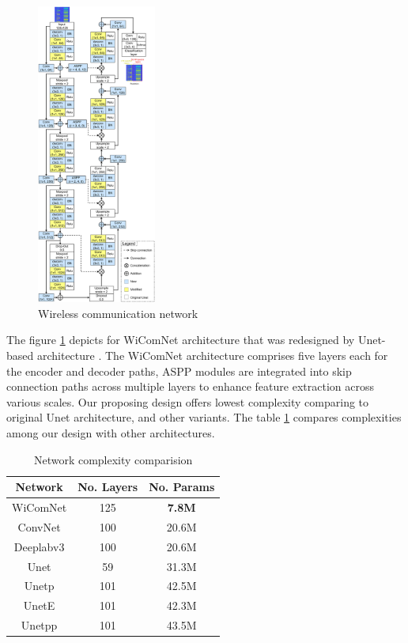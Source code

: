 \documentclass[journal]{IEEEtran} %
\begin{document}
\begin{figure}[!ht]
    \centering
    \includegraphics[width=0.35\textwidth]{img/Design-WiComNetB.jpg}
    \caption{Wireless communication network}
    \label{fig4}
\end{figure}


\indent The figure \ref{fig4} depicts for WiComNet architecture that was redesigned by Unet-based architecture \cite{ronneberger2015u}. The WiComNet architecture comprises five layers each for the encoder and decoder paths, ASPP modules are integrated into skip connection paths across multiple layers to enhance feature extraction across various scales. Our proposing design offers lowest complexity comparing to original Unet architecture, and other variants. The table \ref{tab1} compares complexities among our design with other architectures.

\begin{table}[!htbp]
\centering
\caption{Network complexity comparision}
\label{tab1}
\begin{tabular}{|c|c|c|}
\toprule
\hline
\textbf{Network} & \textbf{No. Layers} & \textbf{No. Params} \\
\hline
WiComNet & 125 & \textbf{7.8M} \\
\hline
ConvNet & 100 & 20.6M \\
\hline
Deeplabv3 & 100 & 20.6M  \\
\hline
Unet & 59 & 31.3M \\
\hline
Unetp & 101 & 42.5M  \\
\hline
UnetE & 101 & 42.3M \\
\hline
Unetpp & 101 & 43.5M  \\
\hline
\bottomrule
\end{tabular}
\end{table}
\end{document}
